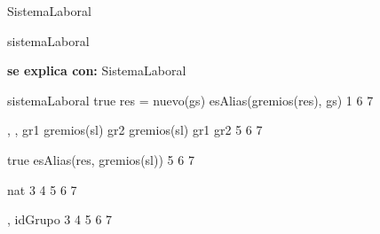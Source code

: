 \begin{interfaz}{SistemaLaboral}
\begin{iparamformales}{sistemaLaboral}

\textbf{\large se explica con:} SistemaLaboral

\end{iparamformales}

{}{sistemaLaboral}
{true}
{res = nuevo(gs) \ly esAlias(gremios(res), gs)}
{1}
{6}
{7}

{, , }{}
{gr1 \in gremios(sl) \ly gr2 \in gremios(sl) \ly gr1 \distinto gr2 }
{}
{5}
{6}
{7}

{true}
{esAlias(res, gremios(sl))}
{5}
{6}
{7}

{}{nat}
{3}
{4}
{5}
{6}
{7}

{, }{idGrupo}
{3}
{4}
{5}
{6}
{7}

\end{interfaz}